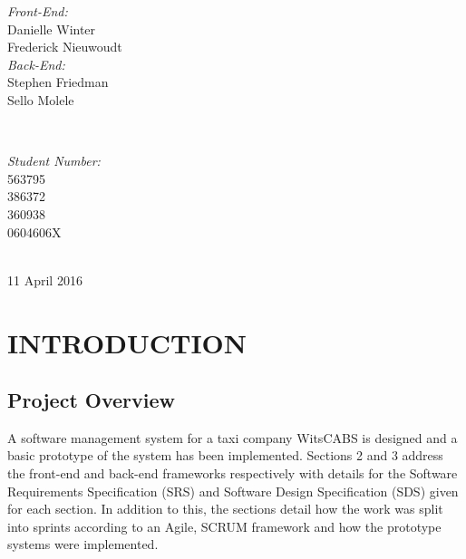 \documentclass[12pt]{article}
\begin{document}
\begin{titlepage}

\begin{minipage}{0.4\textwidth}
\begin{flushleft} 
\emph{Front-End:}\\
Danielle Winter\\
Frederick Nieuwoudt\\[0.1cm]
\emph{Back-End:}\\
Stephen Friedman\\
Sello Molele
\end{flushleft}
\end{minipage}
~
\begin{minipage}{0.4\textwidth}
\begin{flushright} 
\emph{Student Number:} \\
563795\\
386372\\[0.6cm]
360938\\
0604606X
\end{flushright}
\end{minipage}\\[0.5cm]

{\large 11 April 2016}\\[0.5cm]

\begin{abstract}

\end{abstract}

\vfill %

\end{titlepage}
\tableofcontents
\newpage
\section{INTRODUCTION}
\subsection{Project Overview}
A software management system for a taxi company WitsCABS is designed and a basic prototype of the system has been implemented. Sections 2 and 3 address the front-end and back-end frameworks respectively with details for the Software Requirements Specification (SRS) and Software Design Specification (SDS) given for each section. In addition to this, the sections detail how the work was split into sprints according to an Agile, SCRUM framework and how the prototype systems were implemented.
\end{document}
